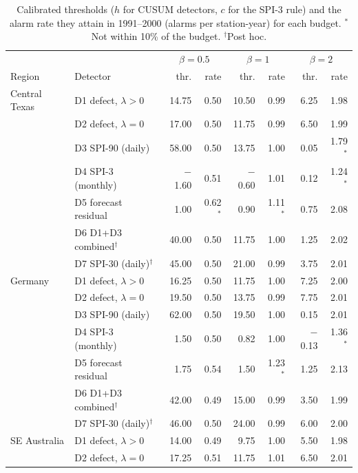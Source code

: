 \begin{table}[h]
\caption{Calibrated thresholds ($h$ for CUSUM detectors, $c$ for the SPI-3 rule) and the alarm rate
they attain in 1991--2000 (alarms per station-year) for each budget. $^{\ast}$Not within 10\% of the
budget. $^{\dagger}$Post hoc.}\label{tab:thresholds}
\footnotesize\setlength{\tabcolsep}{4pt}
\begin{tabular*}{\textwidth}{@{\extracolsep\fill}llrrrrrr}
\toprule
& & \multicolumn{2}{c}{$\beta=0.5$} & \multicolumn{2}{c}{$\beta=1$} & \multicolumn{2}{c}{$\beta=2$}\\
Region & Detector & thr. & rate & thr. & rate & thr. & rate\\
\midrule
Central Texas & D1 defect, $\lambda>0$ & 14.75 & 0.50 & 10.50 & 0.99 & 6.25 & 1.98 \\
 & D2 defect, $\lambda=0$ & 17.00 & 0.50 & 11.75 & 0.99 & 6.50 & 1.99 \\
 & D3 SPI-90 (daily) & 58.00 & 0.50 & 13.75 & 1.00 & 0.05 & 1.79$^{\ast}$ \\
 & D4 SPI-3 (monthly) & $-$1.60 & 0.51 & $-$0.60 & 1.01 & 0.12 & 1.24$^{\ast}$ \\
 & D5 forecast residual & 1.00 & 0.62$^{\ast}$ & 0.90 & 1.11$^{\ast}$ & 0.75 & 2.08 \\
 & D6 D1+D3 combined$^{\dagger}$ & 40.00 & 0.50 & 11.75 & 1.00 & 1.25 & 2.02 \\
 & D7 SPI-30 (daily)$^{\dagger}$ & 45.00 & 0.50 & 21.00 & 0.99 & 3.75 & 2.01 \\
\midrule
Germany & D1 defect, $\lambda>0$ & 16.25 & 0.50 & 11.75 & 1.00 & 7.25 & 2.00 \\
 & D2 defect, $\lambda=0$ & 19.50 & 0.50 & 13.75 & 0.99 & 7.75 & 2.01 \\
 & D3 SPI-90 (daily) & 62.00 & 0.50 & 19.50 & 1.00 & 0.15 & 2.01 \\
 & D4 SPI-3 (monthly) & 1.50 & 0.50 & 0.82 & 1.00 & $-$0.13 & 1.36$^{\ast}$ \\
 & D5 forecast residual & 1.75 & 0.54 & 1.50 & 1.23$^{\ast}$ & 1.25 & 2.13 \\
 & D6 D1+D3 combined$^{\dagger}$ & 42.00 & 0.49 & 15.00 & 0.99 & 3.50 & 1.99 \\
 & D7 SPI-30 (daily)$^{\dagger}$ & 46.00 & 0.50 & 24.00 & 0.99 & 6.00 & 2.00 \\
\midrule
SE Australia & D1 defect, $\lambda>0$ & 14.00 & 0.49 & 9.75 & 1.00 & 5.50 & 1.98 \\
 & D2 defect, $\lambda=0$ & 17.25 & 0.51 & 11.75 & 1.01 & 6.50 & 2.01 \\

\end{tabular*}
\end{table}
